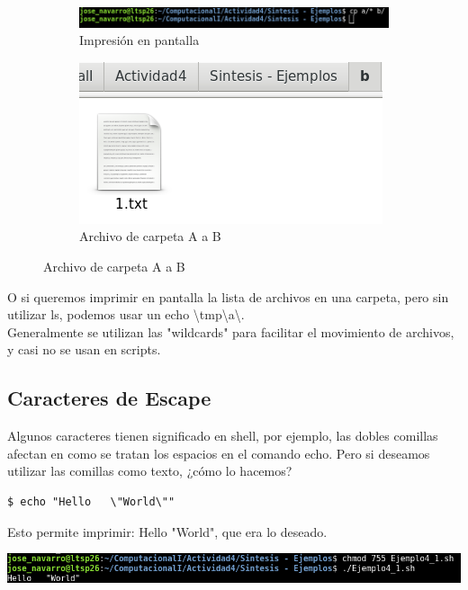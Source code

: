 \documentclass[12pt]{article}
\begin{document}
\begin{figure}[h!]
\begin{subfigure}{.55\textwidth}
  \centering
  \includegraphics[width=.8\linewidth]{Ej3_11.png}
  \caption{Impresión en pantalla}
  \label{fig:sfig1}
\end{subfigure}
\begin{subfigure}{.55\textwidth}
  \centering
  \includegraphics[width=.8\linewidth]{Ej3_12.png}
  \caption{Archivo de carpeta A a B}
  \label{fig:sfig2}
\end{subfigure}
\end{figure}

O si queremos imprimir en pantalla la lista de archivos en una carpeta, pero sin utilizar ls, podemos usar un echo \textbackslash tmp\textbackslash a\textbackslash *. \\

Generalmente se utilizan las "wildcards" para facilitar el movimiento de archivos, y casi no se usan en scripts.

\subsection{Caracteres de Escape}
Algunos caracteres tienen significado en shell, por ejemplo, las dobles comillas afectan en como se tratan los espacios en el comando echo. Pero si deseamos utilizar las comillas como texto, ¿cómo lo hacemos?

\begin{verbatim}
$ echo "Hello   \"World\""
\end{verbatim}

Esto permite imprimir: Hello    "World", que era lo deseado.  \\

\begin{center}
\includegraphics[scale=0.55]{Ej4_1.png}
\end{center} 
\end{document}
